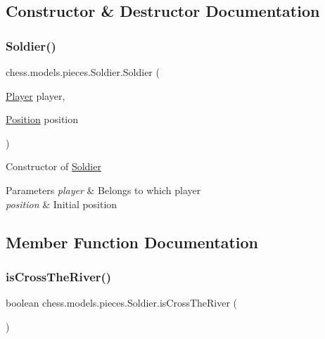 \subsection{Constructor \& Destructor Documentation}
\mbox{\label{classchess_1_1models_1_1pieces_1_1_soldier_a3de8743b5a054a97b126297e3e5fea36}} 
\subsubsection{\texorpdfstring{Soldier()}{Soldier()}}
{\footnotesize\ttfamily chess.\+models.\+pieces.\+Soldier.\+Soldier (\begin{DoxyParamCaption}\item[{\mbox{\hyperlink{enumchess_1_1models_1_1enums_1_1_player}{Player}}}]{player,  }\item[{\mbox{\hyperlink{classchess_1_1models_1_1_position}{Position}}}]{position }\end{DoxyParamCaption})}

Constructor of \mbox{\hyperlink{classchess_1_1models_1_1pieces_1_1_soldier}{Soldier}}


\begin{DoxyParams}{Parameters}
{\em player} & Belongs to which player \\
\hline
{\em position} & Initial position \\
\hline
\end{DoxyParams}


\subsection{Member Function Documentation}
\mbox{\label{classchess_1_1models_1_1pieces_1_1_soldier_a9ee2ecb79068bd41f01608f23cd8dd01}} 
\subsubsection{\texorpdfstring{is\+Cross\+The\+River()}{isCrossTheRiver()}}
{\footnotesize\ttfamily boolean chess.\+models.\+pieces.\+Soldier.\+is\+Cross\+The\+River (\begin{DoxyParamCaption}{ }\end{DoxyParamCaption})}

